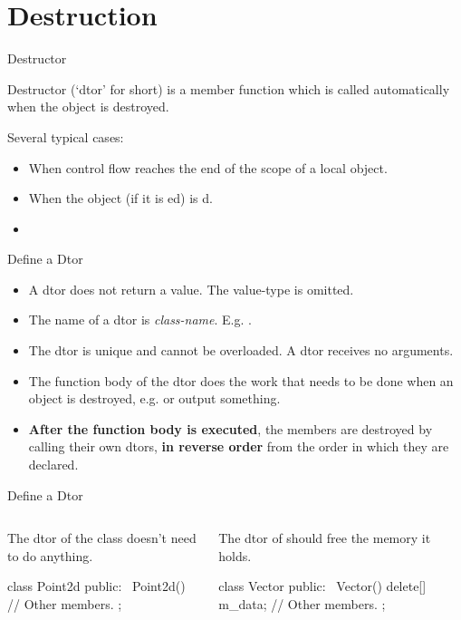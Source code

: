 \documentclass{beamer}
\begin{document}
\section{Destruction}

\begin{frame}{Destructor}
    \begin{definition}[Destructor]
        Destructor (`dtor' for short) is a member function which is called automatically when the object is destroyed.
    \end{definition}
    Several typical cases:
    \begin{itemize}
        \item When control flow reaches the end of the scope of a local object.
        \item When the object (if it is ed) is d.
        \item {}
    \end{itemize}
\end{frame}

\begin{frame}{Define a Dtor}
    \begin{itemize}
        \item A dtor does not return a value. The value-type is omitted.
        \item The name of a dtor is \ttt{\~}\textit{class-name}. E.g. .
        \item The dtor is unique and cannot be overloaded. A dtor receives no arguments.
        \item The function body of the dtor does the work that needs to be done when an object is destroyed, e.g.  or output something.
        \item \textbf{After the function body is executed}, the members are destroyed by calling their own dtors, \textbf{in reverse order} from the order in which they are declared.
    \end{itemize}
\end{frame}

\begin{frame}[fragile]{Define a Dtor}
    \begin{columns}
        \begin{column}{0.5\linewidth}
            The dtor of the  class doesn't need to do anything.
            \begin{cpp}
class Point2d {
 public:
  ~Point2d() {}
  // Other members.
};
            \end{cpp}
        \end{column}
        \begin{column}{0.5\linewidth}
            The dtor of  should free the memory it holds.
            \begin{cpp}
class Vector {
 public:
  ~Vector() { delete[] m_data; }
  // Other members.
};
            \end{cpp}
        \end{column}
    \end{columns}
\end{frame}
\end{document}
